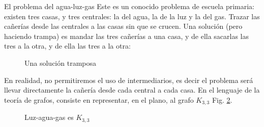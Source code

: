 \begin{section}{El problema del agua-luz-gas}\label{Ap4.2} Este es un conocido problema de escuela primaria: existen tres casas, y tres centrales: la del agua, la de la luz y la del gas. Trazar las cañerías desde las centrales a las casas sin que se crucen. Una solución (pero haciendo trampa) es mandar las tres cañerías a una casa, y de ella sacarlas las tres a la otra, y de ella las tres a la otra:

\begin{figure}[ht]
    \begin{center}
    \end{center}
    \caption{Una solución tramposa} \label{fA4.7}
\end{figure}

En realidad, no permitiremos el uso de intermediarios, es decir el problema será llevar directamente la cañería desde cada central a cada casa. En el lenguaje de la teoría de grafos, consiste en representar, en el plano, al grafo $K_{3,3}$ Fig. \ref{fA4.8}.


\begin{figure}[ht]
    \begin{center}
    \end{center}
    \caption{Luz-agua-gas es $K_{3,3}$} \label{fA4.8}
\end{figure}


\end{section}
